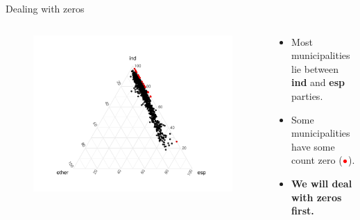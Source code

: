 \documentclass[9pt]{beamer}
\begin{document}
\begin{frame}{Dealing with zeros}

\begin{columns}
\begin{column}{0.5\textwidth}
\begin{figure}\vspace{-0.20cm}
\includegraphics[trim=0cm 0cm 0cm 0cm,width=1.2\textwidth]{ternary_original.pdf}
\end{figure}
\end{column}
\begin{column}{0.5\textwidth}
\begin{itemize}
\item Most municipalities lie between \textbf{ind} and \textbf{esp} parties.
\item Some municipalities have some count zero (${\color{RED}\bullet}$).
\item<2>[$\rightarrow$] \textbf{We will deal with zeros first.}
\end{itemize}
\end{column}
\end{columns}

\end{frame}
\end{document}
